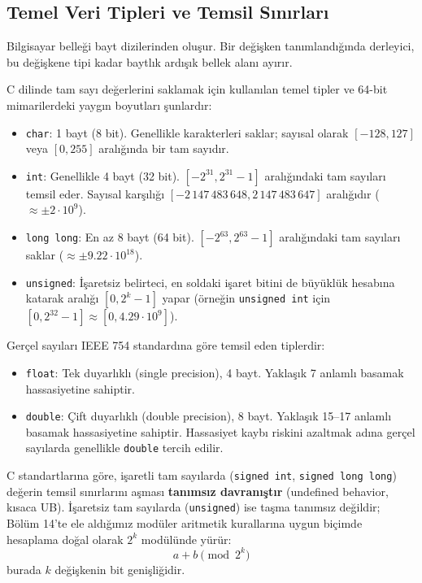 \subsection{Temel Veri Tipleri ve Temsil Sınırları}

Bilgisayar belleği bayt dizilerinden oluşur. Bir değişken tanımlandığında derleyici, bu değişkene tipi kadar baytlık ardışık bellek alanı ayırır.

\begin{definition}
C dilinde tam sayı değerlerini saklamak için kullanılan temel tipler ve 64-bit mimarilerdeki yaygın boyutları şunlardır:
\begin{itemize}
    \item \texttt{char}: 1 bayt (8 bit). Genellikle karakterleri saklar; sayısal olarak $[-128, 127]$ veya $[0, 255]$ aralığında bir tam sayıdır.
    \item \texttt{int}: Genellikle 4 bayt (32 bit). $[-2^{31}, 2^{31}-1]$ aralığındaki tam sayıları temsil eder. Sayısal karşılığı $[-2\,147\,483\,648, 2\,147\,483\,647]$ aralığıdır ($\approx \pm 2 \cdot 10^9$).
    \item \texttt{long long}: En az 8 bayt (64 bit). $[-2^{63}, 2^{63}-1]$ aralığındaki tam sayıları saklar ($\approx \pm 9.22 \cdot 10^{18}$).
    \item \texttt{unsigned}: İşaretsiz belirteci, en soldaki işaret bitini de büyüklük hesabına katarak aralığı $[0, 2^k - 1]$ yapar (örneğin \texttt{unsigned int} için $[0, 2^{32}-1] \approx [0, 4.29 \cdot 10^9]$).
\end{itemize}
\end{definition}

\begin{definition}
Gerçel sayıları IEEE 754 standardına göre temsil eden tiplerdir:
\begin{itemize}
    \item \texttt{float}: Tek duyarlıklı (single precision), 4 bayt. Yaklaşık 7 anlamlı basamak hassasiyetine sahiptir.
    \item \texttt{double}: Çift duyarlıklı (double precision), 8 bayt. Yaklaşık 15--17 anlamlı basamak hassasiyetine sahiptir. Hassasiyet kaybı riskini azaltmak adına gerçel sayılarda genellikle \texttt{double} tercih edilir.
\end{itemize}
\end{definition}

\begin{theorem}
C standartlarına göre, işaretli tam sayılarda (\texttt{signed int}, \texttt{signed long long}) değerin temsil sınırlarını aşması \textbf{tanımsız davranıştır} (undefined behavior, kısaca UB). İşaretsiz tam sayılarda (\texttt{unsigned}) ise taşma tanımsız değildir; Bölüm 14'te ele aldığımız modüler aritmetik kurallarına uygun biçimde hesaplama doğal olarak $2^k$ modülünde yürür:
\[
a + b \pmod{2^k}
\]
burada $k$ değişkenin bit genişliğidir.
\end{theorem}

